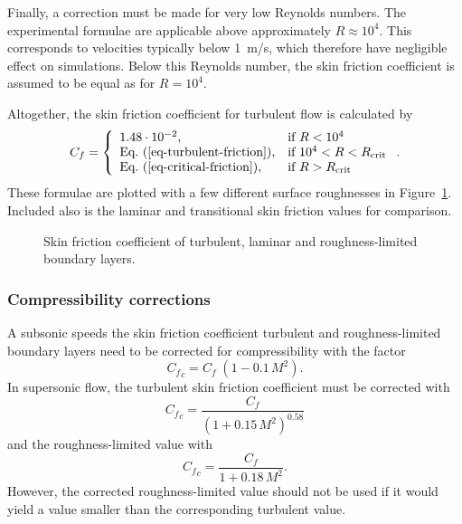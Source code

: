 Finally, a correction must be made for very low Reynolds numbers.  The
experimental formulae are applicable above approximately
$R\approx10^4$.  This corresponds to velocities typically below 1~m/s,
which therefore have negligible effect on simulations.  Below this
Reynolds number, the skin friction coefficient is assumed to be equal
as for $R=10^4$.

Altogether, the skin friction coefficient for turbulent flow is
calculated by
%
\begin{equation}
C_f = \left\{
\begin{array}{ll}
1.48\cdot10^{-2}, & \mbox{if $R<10^4$} \\
\mbox{Eq.~(\ref{eq-turbulent-friction})}, & \mbox{if $10^4<R<R_{\rm crit}$} \\
\mbox{Eq.~(\ref{eq-critical-friction})}, & \mbox{if $R>R_{\rm crit}$}
\end{array}
\right. .
\end{equation}
%
These formulae are plotted with a few different surface roughnesses in
Figure~\ref{fig-skinfriction-plot}.  Included also is the laminar and
transitional skin friction values for comparison.

\begin{figure}
\centering
{}
\caption{Skin friction coefficient of turbulent, laminar and
  roughness-limited boundary layers.}
\label{fig-skinfriction-plot}
\end{figure}


\subsubsection{Compressibility corrections}

A subsonic speeds the skin friction coefficient turbulent and
roughness-limited boundary layers need to be corrected for
compressibility with the factor
%
\begin{equation}
{C_f}_c = C_f\; (1-0.1\, M^2).
\end{equation}
%
In supersonic flow, the turbulent skin friction coefficient must be
corrected with
%
\begin{equation}
{C_f}_c = \frac{C_f}{(1+0.15\, M^2)^{0.58}}
\end{equation}
%
and the roughness-limited value with
%
\begin{equation}
{C_f}_c = \frac{C_f}{1 + 0.18\, M^2}.
\end{equation}
%
However, the corrected roughness-limited value should not be used if
it would yield a value smaller than the corresponding turbulent
value.


